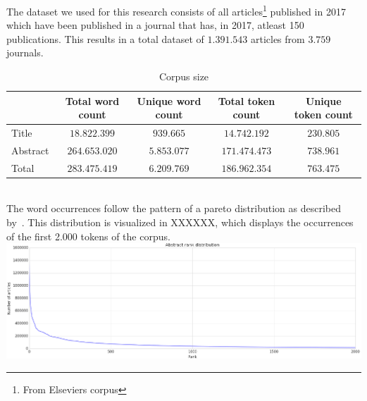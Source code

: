 \documentclass[../../Thesis.tex]{subfiles}
\begin{document}
The dataset we used for this research consists of all articles\footnote{From Elseviers corpus} published in 2017 which have been published in a journal that has, in 2017, atleast 150 publications. This results in a total dataset of $1.391.543$ articles from $3.759$ journals.
\begin{table}[hbt]
\begin{center}
\begin{tabular}{|l|c|c|c|c|}
\hline
 & Total word count & Unique word count & Total token count & Unique token count \\
\hline
Title & $18.822.399$ & $939.665$ & $14.742.192$ & $230.805$ \\
\hline
Abstract & $264.653.020$ & $5.853.077$ & $171.474.473$ & $738.961$ \\
\hline
Total & $283.475.419$ & $6.209.769$ & $186.962.354$ & $763.475$ \\
\hline
\end{tabular}
\end{center}
\caption{Corpus size}\label{table:corpusSize}
\end{table}\\
The word occurrences follow the pattern of a pareto distribution as described by~\citet{wiegand2018word}. This distribution is visualized in XXXXXX, which displays the occurrences of the first 2.000 tokens of the corpus.
\includegraphics[width=6.5in]{Plots/word_occurrences}\\
\end{document}
